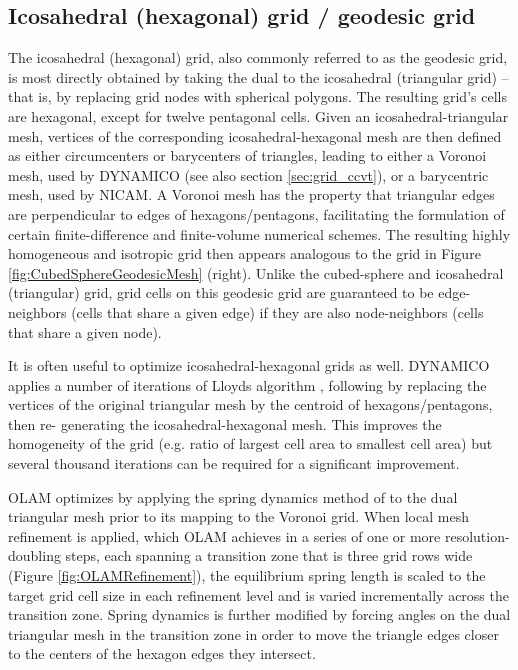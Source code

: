 \documentclass[gmd, manuscript]{copernicus}
\begin{document}
\subsection{Icosahedral (hexagonal) grid / geodesic grid} \label{sec:grid_geo}

The icosahedral (hexagonal) grid, also commonly referred to as the geodesic grid, is most directly obtained by taking the dual to the icosahedral (triangular grid) -- that is, by replacing grid nodes with spherical polygons.  The resulting grid's cells are hexagonal, except for twelve pentagonal cells.  Given an icosahedral-triangular mesh, vertices of the corresponding icosahedral-hexagonal mesh are then defined as either circumcenters or barycenters of triangles, leading to either a Voronoi mesh, used by DYNAMICO (see also section \ref{sec:grid_ccvt}), or a barycentric mesh, used by NICAM.  A Voronoi mesh has the property that triangular edges are perpendicular to edges of hexagons/pentagons, facilitating the formulation of certain finite-difference and finite-volume numerical schemes.  The resulting highly homogeneous and isotropic grid then appears analogous to the grid in Figure \ref{fig:CubedSphereGeodesicMesh} (right).  Unlike the cubed-sphere and icosahedral (triangular) grid, grid cells on this geodesic grid are guaranteed to be edge-neighbors (cells that share a given edge) if they are also node-neighbors (cells that share a given node).

It is often useful to optimize icosahedral-hexagonal grids as well.  DYNAMICO applies a number of iterations of Lloyds algorithm \citep{lloyd1982least}, following by replacing the vertices of the original triangular mesh by the centroid of hexagons/pentagons, then re- generating the icosahedral-hexagonal mesh. This improves the homogeneity of the grid (e.g. ratio of largest cell area to smallest cell area) but several thousand iterations can be required for a significant improvement.

OLAM optimizes by applying the spring dynamics method of \cite{tomita2001shallow} to the dual triangular mesh prior to its mapping to the Voronoi grid. When local mesh refinement is applied, which OLAM achieves in a series of one or more resolution-doubling steps, each spanning a transition zone that is three grid rows wide (Figure \ref{fig:OLAMRefinement}), the equilibrium spring length is scaled to the target grid cell size in each refinement level and is varied incrementally across the transition zone. Spring dynamics is further modified by forcing angles on the dual triangular mesh in the transition zone in order to move the triangle edges closer to the centers of the hexagon edges they intersect.
\end{document}
